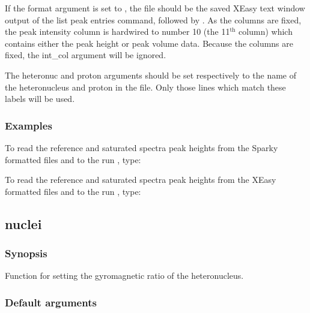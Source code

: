 If the format argument is set to 
, the file should be the saved XEasy text window
output of the list peak entries command, 
 followed by 
.  As the columns are fixed,
the peak intensity column is hardwired to number 10 (the 11$^\mathrm{th}$ column) which contains either
the peak height or peak volume data.  Because the columns are fixed, the int\_col argument
will be ignored.


The heteronuc and proton arguments should be set respectively to the name of the
heteronucleus and proton in the file.  Only those lines which match these labels will be
used.


\subsubsection{Examples}

To read the reference and saturated spectra peak heights from the Sparky formatted files
 and 
 to the run 
, type:




To read the reference and saturated spectra peak heights from the XEasy formatted files
 and 
 to the run 
, type:





\newpage

\subsection{nuclei}


\subsubsection{Synopsis}

Function for setting the gyromagnetic ratio of the heteronucleus.

\subsubsection{Default arguments}

